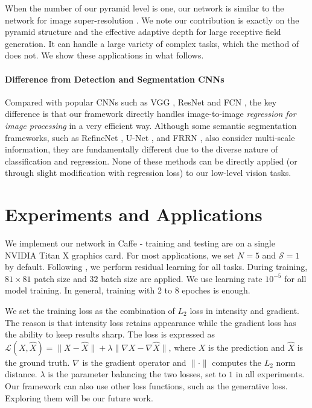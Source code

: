 \documentclass[10pt,twocolumn,letterpaper]{article}
\begin{document}
When the number of our pyramid level is one, our network is similar to the network for
image super-resolution \cite{DongLT16}. We note our contribution is exactly on the
pyramid structure and the effective adaptive depth for large receptive field generation.
It can handle a large variety of complex tasks, which the method of \cite{DongLT16} does
not. We show these applications in what follows.

\vspace{-0.15in}\paragraph{Difference from Detection and Segmentation CNNs~~} Compared
with popular CNNs such as VGG \cite{SimonyanZ14a}, ResNet \cite{HeZRS15} and FCN
\cite{LongSD15}, the key difference is that our framework directly handles image-to-image
{\it regression for image processing} in a very efficient way. Although some semantic
segmentation frameworks, such as RefineNet \cite{LinMS016}, U-Net \cite{RonnebergerFB15},
and FRRN \cite{PohlenHML16}, also consider multi-scale information, they are
fundamentally different due to the diverse nature of classification and regression. None
of these methods can be directly applied (or through slight modification with regression
loss) to our low-level vision tasks.


\section{Experiments and Applications} \label{sec:experiment}

We implement our network in Caffe \cite{JiaSDKLGGD14} - training and testing are on a
single NVIDIA Titan X graphics card. For most applications, we set $N=5$ and
$\mathcal{S}=1$ by default. Following \cite{KimLL15b}, we perform residual learning for
all tasks. During training, $81\times81$ patch size and $32$ batch size are applied. We
use learning rate $10^{-5}$ for all model training. In general, training with 2 to 8
epoches is enough.

We set the training loss as the combination of $L_2$ loss in intensity and gradient. The
reason is that intensity loss retains appearance while the gradient loss has the ability
to keep results sharp. The loss is expressed as $ \mathcal{L}(X,\hat{X}) = \|X-\hat{X}\|
+ \lambda \|\nabla X-\nabla \hat{X}\|$, where $X$ is the prediction and $\hat{X}$ is the
ground truth. $\nabla$ is the gradient operator and $\|\cdot\|$ computes the $L_2$ norm
distance. $\lambda$ is the parameter balancing the two losses, set to $1$ in all
experiments. Our framework can also use other loss functions, such as the generative
loss. Exploring them will be our future work.
\end{document}
